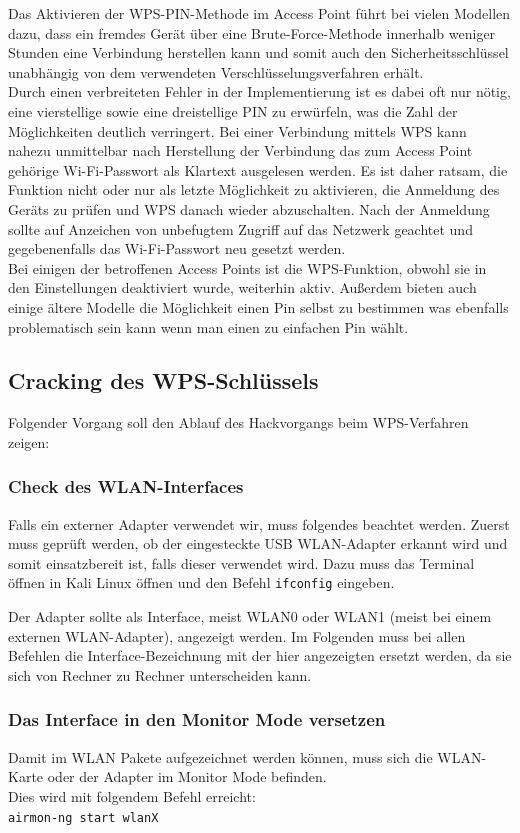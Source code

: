 Das Aktivieren der WPS-PIN-Methode im Access Point führt bei vielen Modellen dazu, dass ein fremdes Gerät über eine Brute-Force-Methode innerhalb weniger Stunden eine Verbindung herstellen kann und somit auch den Sicherheitsschlüssel unabhängig von dem verwendeten Verschlüsselungsverfahren erhält. \\
Durch einen verbreiteten Fehler in der Implementierung ist es dabei oft nur nötig, eine vierstellige sowie eine dreistellige PIN zu erwürfeln, was die Zahl der Möglichkeiten deutlich verringert. Bei einer Verbindung mittels WPS kann nahezu unmittelbar nach Herstellung der Verbindung das zum Access Point gehörige Wi-Fi-Passwort als Klartext ausgelesen werden. Es ist daher ratsam, die Funktion nicht oder nur als letzte Möglichkeit zu aktivieren, die Anmeldung des Geräts zu prüfen und WPS danach wieder abzuschalten. Nach der Anmeldung sollte auf Anzeichen von unbefugtem Zugriff auf das Netzwerk geachtet und gegebenenfalls das Wi-Fi-Passwort neu gesetzt werden. \\
Bei einigen der betroffenen Access Points ist die WPS-Funktion, obwohl sie in den Einstellungen deaktiviert wurde, weiterhin aktiv. Außerdem bieten auch einige ältere Modelle die Möglichkeit einen Pin selbst zu bestimmen was ebenfalls problematisch sein kann wenn man einen zu einfachen Pin wählt.

\subsection{Cracking des WPS-Schlüssels}
Folgender Vorgang soll den Ablauf des Hackvorgangs beim WPS-Verfahren zeigen:

\subsubsection{Check des WLAN-Interfaces}
	Falls ein externer Adapter verwendet wir, muss folgendes beachtet werden. Zuerst muss geprüft werden, ob der eingesteckte USB WLAN-Adapter erkannt wird und somit einsatzbereit ist, falls dieser verwendet wird. Dazu muss das Terminal öffnen in Kali Linux öffnen und den Befehl \colorbox{altgray}{\lstinline|ifconfig|} eingeben.

	Der Adapter sollte als Interface, meist WLAN0 oder WLAN1 (meist bei einem externen WLAN-Adapter), angezeigt werden. Im Folgenden muss bei allen Befehlen die Interface-Bezeichnung mit der hier angezeigten ersetzt werden, da sie sich von Rechner zu Rechner unterscheiden kann.

	\subsubsection{Das Interface in den Monitor Mode versetzen}
	Damit im WLAN Pakete aufgezeichnet werden können, muss sich die WLAN-Karte oder der Adapter im Monitor Mode befinden. \\
	Dies wird mit folgendem Befehl erreicht: \\
	\colorbox{altgray}{\lstinline|airmon-ng start wlanX|} \\

